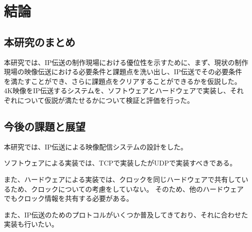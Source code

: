 \chapter{結論}
\label{chap:conclusion}

\section{本研究のまとめ}

本研究では、IP伝送の制作現場における優位性を示すために、まず、現状の制作現場の映像伝送における必要条件と課題点を洗い出し、IP伝送でその必要条件を満たすことができ、さらに課題点をクリアすることができるかを仮説した。
4K映像をIP伝送するシステムを、ソフトウェアとハードウェアで実装し、それぞれについて仮説が満たせるかについて検証と評価を行った。

\section{今後の課題と展望}

本研究では、IP伝送による映像配信システムの設計をした。

ソフトウェアによる実装では、TCPで実装したがUDPで実装すべきである。

また、ハードウェアによる実装では、クロックを同じハードウェアで共有しているため、クロックについての考慮をしていない。
そのため、他のハードウェアでもクロック情報を共有する必要がある。

また、IP伝送のためのプロトコルがいくつか普及してきており、それに合わせた実装も行いたい。
